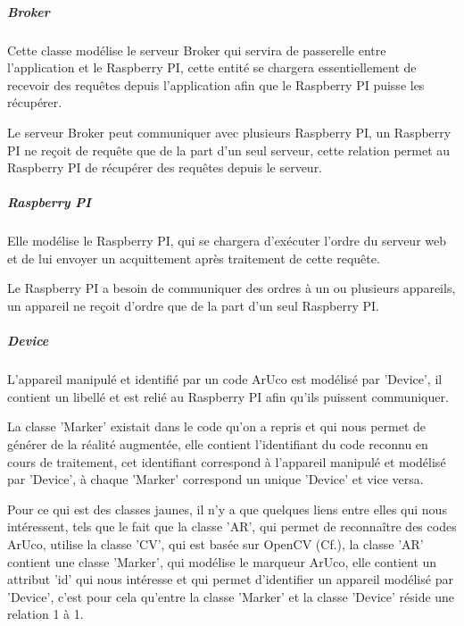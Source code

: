 \documentclass[12pt,a4paper]{article}
\begin{document}
\subparagraph{Broker}
Cette classe modélise le serveur Broker qui servira de passerelle entre l'application et le Raspberry PI, cette entité se chargera essentiellement de recevoir des requêtes depuis l'application afin que le Raspberry PI puisse  les récupérer.\par
Le serveur Broker peut communiquer avec plusieurs Raspberry PI, un Raspberry PI ne reçoit de requête que de la part d'un seul serveur, cette relation permet au Raspberry PI de récupérer des requêtes depuis le serveur.
\subparagraph{Raspberry PI}
Elle modélise le Raspberry PI, qui se chargera d'exécuter l'ordre du serveur web et de lui envoyer un acquittement après traitement de cette requête.\par%
Le Raspberry PI a besoin de communiquer des ordres à un ou plusieurs appareils, un appareil ne reçoit d'ordre que de la part d'un seul Raspberry PI.
\subparagraph{Device}
L'appareil manipulé et identifié par un code ArUco est modélisé par 'Device', il contient un libellé et est relié au Raspberry PI afin qu'ils puissent communiquer.\par
La classe 'Marker' existait dans le code qu'on a repris et qui nous permet de générer de la réalité augmentée, elle contient l'identifiant du code reconnu en cours de traitement, cet identifiant correspond à l'appareil manipulé et modélisé par 'Device', à chaque 'Marker' correspond un unique 'Device' et vice versa.\par
Pour ce qui est des classes jaunes, il n'y a que quelques liens entre elles qui nous intéressent, tels que le fait que la classe 'AR', qui permet de reconnaître des codes ArUco, utilise la classe 'CV', qui est basée sur OpenCV (Cf.\cite{Ref9}), la classe 'AR' contient une classe 'Marker', qui modélise le marqueur ArUco, elle contient un attribut 'id' qui nous intéresse et qui permet d'identifier un appareil modélisé par 'Device', c'est pour cela qu'entre la classe 'Marker' et la classe 'Device' réside une relation 1 à 1.  
\newpage

\end{document}
